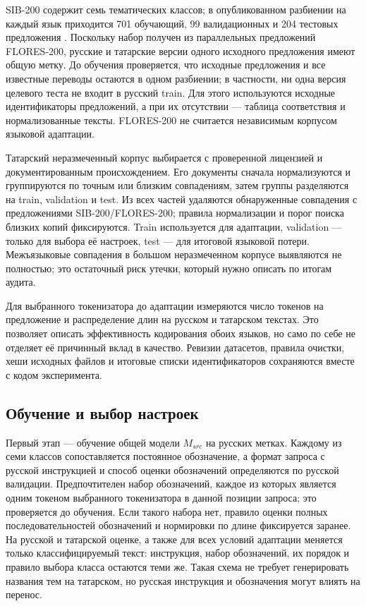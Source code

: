 \documentclass{misisarticle}
\begin{document}
SIB-200 содержит семь тематических классов; в опубликованном разбиении на каждый язык приходится 701 обучающий, 99 валидационных и 204 тестовых предложения \cite[табл.~1]{adelani2023sib}. Поскольку набор получен из параллельных предложений FLORES-200, русские и татарские версии одного исходного предложения имеют общую метку. До обучения проверяется, что исходные предложения и все известные переводы остаются в одном разбиении; в частности, ни одна версия целевого теста не входит в русский train. Для этого используются исходные идентификаторы предложений, а при их отсутствии — таблица соответствия и нормализованные тексты. FLORES-200 не считается независимым корпусом языковой адаптации.

Татарский неразмеченный корпус выбирается с проверенной лицензией и документированным происхождением. Его документы сначала нормализуются и группируются по точным или близким совпадениям, затем группы разделяются на train, validation и test. Из всех частей удаляются обнаруженные совпадения с предложениями SIB-200/FLORES-200; правила нормализации и порог поиска близких копий фиксируются. Train используется для адаптации, validation — только для выбора её настроек, test — для итоговой языковой потери. Межъязыковые совпадения в большом неразмеченном корпусе выявляются не полностью; это остаточный риск утечки, который нужно описать по итогам аудита.

Для выбранного токенизатора до адаптации измеряются число токенов на предложение и распределение длин на русском и татарском текстах. Это позволяет описать эффективность кодирования обоих языков, но само по себе не отделяет её причинный вклад в качество. Ревизии датасетов, правила очистки, хеши исходных файлов и итоговые списки идентификаторов сохраняются вместе с кодом эксперимента.

\subsection{Обучение и выбор настроек}

Первый этап — обучение общей модели $M_{src}$ на русских метках. Каждому из семи классов сопоставляется постоянное обозначение, а формат запроса с русской инструкцией и способ оценки обозначений определяются по русской валидации. Предпочтителен набор обозначений, каждое из которых является одним токеном выбранного токенизатора в данной позиции запроса; это проверяется до обучения. Если такого набора нет, правило оценки полных последовательностей обозначений и нормировки по длине фиксируется заранее. На русской и татарской оценке, а также для всех условий адаптации меняется только классифицируемый текст: инструкция, набор обозначений, их порядок и правило выбора класса остаются теми же. Такая схема не требует генерировать названия тем на татарском, но русская инструкция и обозначения могут влиять на перенос.
\end{document}
